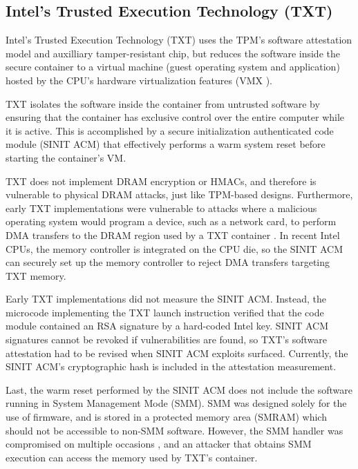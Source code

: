 \subsection{Intel's Trusted Execution Technology (TXT)}

Intel's Trusted Execution Technology (TXT) \cite{grawrock2009txt} uses the
TPM's software attestation model and auxilliary tamper-resistant chip, but
reduces the software inside the secure container to a virtual machine (guest
operating system and application) hosted by the CPU's hardware virtualization
features (VMX \cite{uhlig2005vmx}).

TXT isolates the software inside the container from untrusted software by
ensuring that the container has exclusive control over the entire computer
while it is active. This is accomplished by a secure initialization
authenticated code module (SINIT ACM) that effectively performs a warm system
reset before starting the container's VM.

TXT does not implement DRAM encryption or HMACs, and therefore is vulnerable to
physical DRAM attacks, just like TPM-based designs. Furthermore, early TXT
implementations were vulnerable to attacks where a malicious operating system
would program a device, such as a network card, to perform DMA transfers
to the DRAM region used by a TXT container \cite{wojtczuk2009txt,
wojtczuk2009txt2}. In recent Intel CPUs, the memory controller is integrated on
the CPU die, so the SINIT ACM
can securely set up the memory controller to reject DMA transfers targeting TXT
memory.

Early TXT implementations did not measure the SINIT ACM. Instead, the microcode
implementing the TXT launch instruction verified that the code module contained
an RSA signature by a hard-coded Intel key. SINIT ACM signatures cannot be
revoked if vulnerabilities are found, so TXT's software attestation had to be
revised when SINIT ACM exploits \cite{wojtczuk2011txt} surfaced. Currently, the
SINIT ACM's cryptographic hash is included in the attestation measurement.

Last, the warm reset performed by the SINIT ACM does not include the software
running in System Management Mode (SMM). SMM was designed
solely for the use of firmware, and is stored in a protected memory area
(SMRAM) which should not be accessible to non-SMM software. However, the SMM
handler was compromised on multiple occasions \cite{duflot2006smm,
rutkowska2008remap, wojtczuk2009smm, wecherowski2009smm, embleton2010smm}, and
an attacker that obtains SMM execution can access the memory used by TXT's
container.
